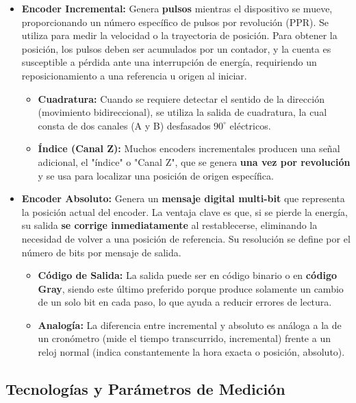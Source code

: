 \begin{itemize}
    \item \textbf{Encoder Incremental:} Genera \textbf{pulsos} mientras el dispositivo se mueve, proporcionando un número específico de pulsos por revolución (PPR). Se utiliza para medir la velocidad o la trayectoria de posición. Para obtener la posición, los pulsos deben ser acumulados por un contador, y la cuenta es susceptible a pérdida ante una interrupción de energía, requiriendo un reposicionamiento a una referencia u origen al iniciar.
    \begin{itemize}
        \item \textbf{Cuadratura:} Cuando se requiere detectar el sentido de la dirección (movimiento bidireccional), se utiliza la salida de cuadratura, la cual consta de dos canales (A y B) desfasados $90^{\circ}$ eléctricos.
        \item \textbf{Índice (Canal Z):} Muchos encoders incrementales producen una señal adicional, el "índice" o "Canal Z", que se genera \textbf{una vez por revolución} y se usa para localizar una posición de origen específica.
    \end{itemize}

    \item \textbf{Encoder Absoluto:} Genera un \textbf{mensaje digital multi-bit} que representa la posición actual del encoder. La ventaja clave es que, si se pierde la energía, su salida \textbf{se corrige inmediatamente} al restablecerse, eliminando la necesidad de volver a una posición de referencia. Su resolución se define por el número de bits por mensaje de salida.
    \begin{itemize}
        \item \textbf{Código de Salida:} La salida puede ser en código binario o en \textbf{código Gray}, siendo este último preferido porque produce solamente un cambio de un solo bit en cada paso, lo que ayuda a reducir errores de lectura.
        \item \textbf{Analogía:} La diferencia entre incremental y absoluto es análoga a la de un cronómetro (mide el tiempo transcurrido, incremental) frente a un reloj normal (indica constantemente la hora exacta o posición, absoluto).
    \end{itemize}
\end{itemize}

\subsection{Tecnologías y Parámetros de Medición}

